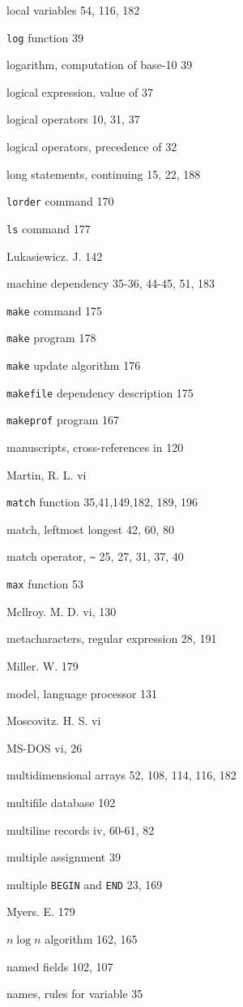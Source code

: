 \begin{multicols}{3}
local variables 54, 116, 182

\verb'log' function 39

logarithm, computation of base-10 39

logical expression, value of 37

logical operators 10, 31, 37

logical operators, precedence of 32

long statements, continuing 15, 22, 188

\verb'lorder' command 170

\verb'ls' command 177

Lukasiewicz. J. 142

machine dependency 35-36, 44-45, 51, 183

\verb'make' command 175

\verb'make' program 178

\verb'make' update algorithm 176

\verb'makefile' dependency description 175

\verb'makeprof' program 167

manuscripts, cross-references in 120

Martin, R. L. vi

\verb'match' function 35,41,149,182, 189, 196

match, leftmost longest 42, 60, 80

match operator, \verb'~' 25, 27, 31, 37, 40

\verb'max' function 53

Mcllroy. M. D. vi, 130

metacharacters, regular expression 28, 191

Miller. W. 179

model, language processor 131

Moscovitz. H. S. vi

MS-DOS vi, 26

multidimensional arrays 52, 108, 114, 116, 182

multifile database 102

multiline records iv, 60-61, 82

multiple assignment 39

multiple \verb'BEGIN' and \verb'END' 23, 169

Myers. E. 179

$n \log n$ algorithm 162, 165

named fields 102, 107

names, rules for variable 35


\end{multicols}

